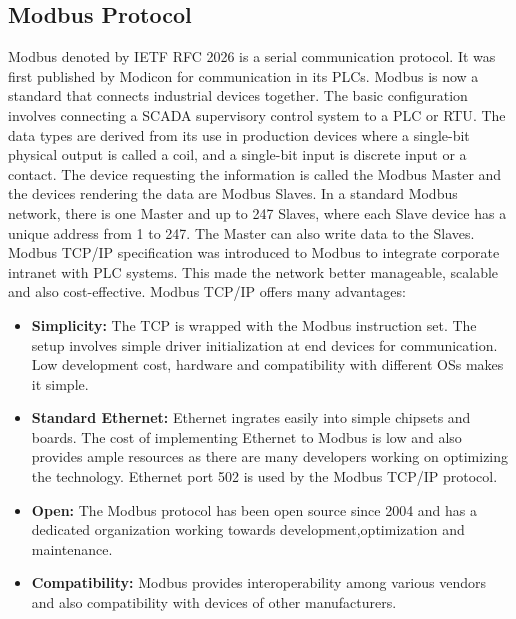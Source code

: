 \documentclass[article,msc=informatik,type=msc,colorback,accentcolor=tud9c]{tudthesis}
\begin{document}
    \vspace{5mm} 
    	\subsection{Modbus Protocol}\label{Modbus Protocol}
    
    	Modbus denoted by \ac{IETF} \ac{RFC} 2026 is a serial communication protocol. It was first published by Modicon for communication in its \ac{PLC}s. Modbus is now a standard that connects industrial devices together. The basic configuration involves connecting a \ac{SCADA} supervisory control system to a \ac{PLC} or \ac{RTU}. The data types are derived from its use in production devices where a single-bit physical output is called a coil, and a single-bit input is discrete input or a contact. The device requesting the information is called the Modbus Master and the devices rendering the data are Modbus Slaves. In a standard Modbus network, there is one Master and up to 247 Slaves, where each Slave device has a unique address from 1 to 247. The Master can also write data to the Slaves.
    	Modbus TCP/IP specification was introduced to Modbus to integrate corporate intranet with \ac{PLC} systems. This made the network better manageable, scalable and also cost-effective. Modbus TCP/IP offers many advantages:
    
    	\begin{itemize}
    
    	\item\textbf{Simplicity:} The \ac{TCP} is wrapped with the  Modbus instruction set. The setup involves simple driver initialization at end devices for communication. Low development cost, hardware and compatibility with different \ac{OS}s makes it simple.
    
    	\item\textbf{Standard Ethernet:}  Ethernet ingrates easily into simple chipsets and boards. The cost of implementing Ethernet to Modbus is low and also provides ample resources as there are many developers working on optimizing the technology. Ethernet port 502 is used by the Modbus TCP/IP protocol.
    
    	\item\textbf{Open:} The Modbus protocol has been open source since 2004 and has a dedicated organization working towards development,optimization and maintenance.
    
    	\item\textbf{Compatibility:} Modbus provides interoperability among various vendors and also compatibility with devices of other manufacturers. 
    
    	\end{itemize}
    
\end{document}
